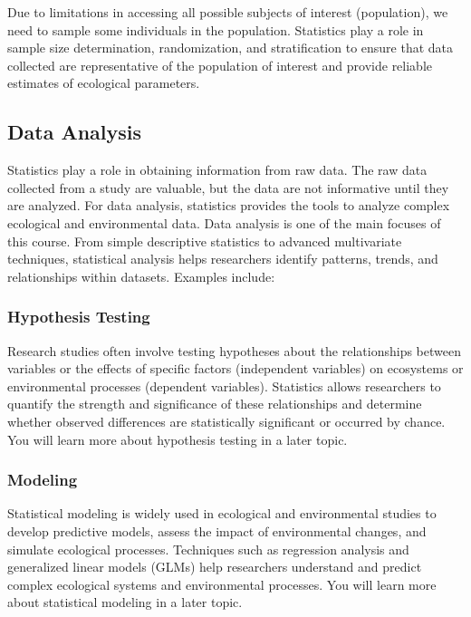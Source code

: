 \documentclass[
]{book}
\begin{document}
Due to limitations in accessing all possible subjects of interest (population), we need to sample some individuals in the population. Statistics play a role in sample size determination, randomization, and stratification to ensure that data collected are representative of the population of interest and provide reliable estimates of ecological parameters.

\subsection{Data Analysis}\label{data-analysis}

Statistics play a role in obtaining information from raw data. The raw data collected from a study are valuable, but the data are not informative until they are analyzed. For data analysis, statistics provides the tools to analyze complex ecological and environmental data. Data analysis is one of the main focuses of this course. From simple descriptive statistics to advanced multivariate techniques, statistical analysis helps researchers identify patterns, trends, and relationships within datasets. Examples include:

\subsubsection{Hypothesis Testing}\label{hypothesis-testing}

Research studies often involve testing hypotheses about the relationships between variables or the effects of specific factors (independent variables) on ecosystems or environmental processes (dependent variables). Statistics allows researchers to quantify the strength and significance of these relationships and determine whether observed differences are statistically significant or occurred by chance. You will learn more about hypothesis testing in a later topic.

\subsubsection{Modeling}\label{modeling}

Statistical modeling is widely used in ecological and environmental studies to develop predictive models, assess the impact of environmental changes, and simulate ecological processes. Techniques such as regression analysis and generalized linear models (GLMs) help researchers understand and predict complex ecological systems and environmental processes. You will learn more about statistical modeling in a later topic.
\end{document}

